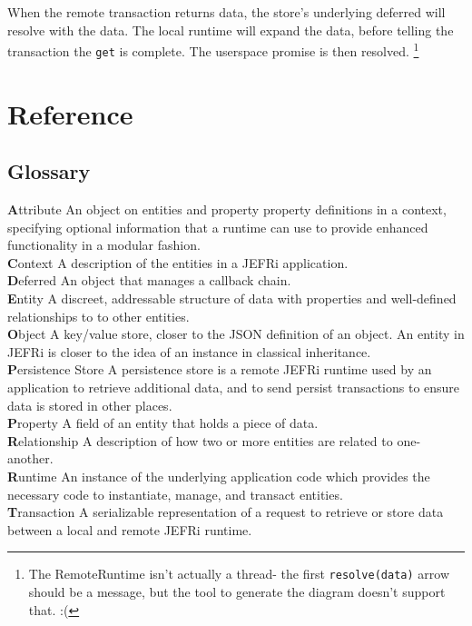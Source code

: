 \documentclass{article}
\newcommand{\ilcode}{\tt}
\renewcommand{\glossary}[2]{{\large \textbf #1} #2 \\ }
\begin{document}
When the remote transaction returns data, the store's underlying deferred will
resolve with the data. The local runtime will expand the data, before telling
the transaction the {\ilcode get} is complete. The userspace promise is then
resolved. \footnote{The RemoteRuntime isn't actually a thread- the first
{\ilcode resolve(data)} arrow should be a message, but the tool to generate the
diagram doesn't support that. :(}

\newpage
\section{Reference}

\subsection{Glossary}


\glossary{Attribute}{An object on entities and property property definitions in
a context, specifying optional information that a runtime can use to provide
enhanced functionality in a modular fashion.}

\glossary{Context}{A description of the entities in a JEFRi application.}

\glossary{Deferred}{An object that manages a callback chain.}

\glossary{Entity}{A discreet, addressable structure of data with properties and
well-defined relationships to to other entities.}

\glossary{Object}{A key/value store, closer to the JSON definition of an object.
An entity in JEFRi is closer to the idea of an instance in classical
inheritance.}

\glossary{Persistence Store}{A persistence store is a remote JEFRi runtime used
by an application to retrieve additional data, and to send persist transactions
to ensure data is stored in other places.}

\glossary{Property}{A field of an entity that holds a piece of data.}

\glossary{Relationship}{A description of how two or more entities are related to
one-another.}

\glossary{Runtime}{An instance of the underlying application code which provides
the necessary code to instantiate, manage, and transact entities.}

\glossary{Transaction}{A serializable representation of a request to retrieve or
store data between a local and remote JEFRi runtime.}
\end{document}
